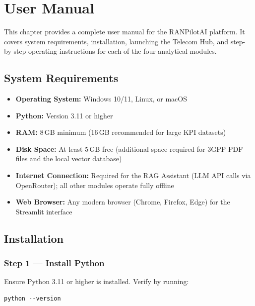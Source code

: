 \chapter{User Manual}
\label{chap:user_manual}

This chapter provides a complete user manual for the RANPilotAI platform. It covers system requirements, installation, launching the Telecom Hub, and step-by-step operating instructions for each of the four analytical modules.

\section{System Requirements}

\begin{itemize}
    \item \textbf{Operating System:} Windows 10/11, Linux, or macOS
    \item \textbf{Python:} Version 3.11 or higher
    \item \textbf{RAM:} 8\,GB minimum (16\,GB recommended for large KPI datasets)
    \item \textbf{Disk Space:} At least 5\,GB free (additional space required for 3GPP PDF files and the local vector database)
    \item \textbf{Internet Connection:} Required for the RAG Assistant (LLM API calls via OpenRouter); all other modules operate fully offline
    \item \textbf{Web Browser:} Any modern browser (Chrome, Firefox, Edge) for the Streamlit interface
\end{itemize}

\section{Installation}

\subsection{Step 1 — Install Python}

Ensure Python 3.11 or higher is installed. Verify by running:

\begin{verbatim}
python --version
\end{verbatim}

